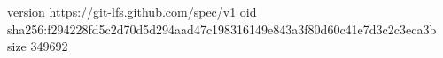 version https://git-lfs.github.com/spec/v1
oid sha256:f294228fd5c2d70d5d294aad47c198316149e843a3f80d60c41e7d3c2c3eca3b
size 349692
